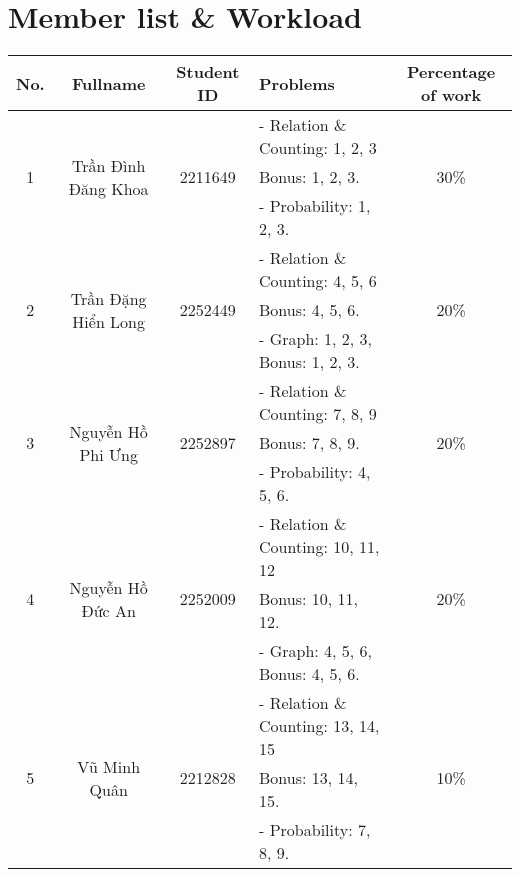 \newpage

\section{Member list \& Workload}

\begin{center}
\begin{tabular}{|c|c|c|l|c|}
\hline
\textbf{No.} & \textbf{Fullname} & \textbf{Student ID} & \textbf{Problems} & \textbf{Percentage of work}\\
\hline 
\multirow{3}{*}{1} & \multirow{3}{*}{Trần Đình Đăng Khoa} & \multirow{3}{*}{2211649} & - Relation \& Counting: 1, 2, 3& \multirow{3}{*}{30\%}\\
 & &  & Bonus: 1, 2, 3. &\\
 & &  & - Probability: 1, 2, 3. &\\
\hline 
\multirow{3}{*}{2} & \multirow{3}{*}{Trần Đặng Hiển Long} & \multirow{3}{*}{2252449} & - Relation \& Counting: 4, 5, 6& \multirow{3}{*}{20\%}\\
 & &  & Bonus: 4, 5, 6. &\\
 & &  & - Graph: 1, 2, 3, Bonus: 1, 2, 3. &\\
\hline
\multirow{3}{*}{3} & \multirow{3}{*}{Nguyễn Hồ Phi Ưng} & \multirow{3}{*}{2252897} & - Relation \& Counting: 7, 8, 9& \multirow{3}{*}{20\%}\\
 & &  & Bonus: 7, 8, 9. &\\
 & &  & - Probability: 4, 5, 6. &\\
\hline
\multirow{3}{*}{4} & \multirow{3}{*}{Nguyễn Hồ Đức An} & \multirow{3}{*}{2252009} & - Relation \& Counting: 10, 11, 12& \multirow{3}{*}{20\%}\\
 & &  & Bonus: 10, 11, 12. &\\
 & &  & - Graph: 4, 5, 6, Bonus: 4, 5, 6. &\\
\hline
\multirow{3}{*}{5} & \multirow{3}{*}{Vũ Minh Quân} & \multirow{3}{*}{2212828} & - Relation \& Counting: 13, 14, 15& \multirow{3}{*}{10\%}\\
 & &  & Bonus: 13, 14, 15. &\\
 & &  & - Probability: 7, 8, 9. &\\
\hline
\end{tabular}
\end{center}